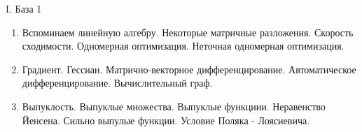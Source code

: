 \documentclass[9pt, aspectratio=169]{beamer}
\begin{document}
\begin{frame}{I. База 1}
    \begin{minipage}{0.618\textwidth}
        \begin{enumerate}
            \item Вспоминаем линейную алгебру. Некоторые матричные разложения. Скорость сходимости. Одномерная оптимизация. Неточная одномерная оптимизация.
            \item Градиент. Гессиан. Матрично-векторное дифференцирование. Автоматическое дифференцирование. Вычислительный граф.
            \item Выпуклость. Выпуклые множества. Выпуклые функциии. Неравенство Йенсена. Сильно выпулые функции. Условие Поляка - Лоясиевича.
        \end{enumerate}
      \end{minipage}%
      \begin{minipage}{0.382\textwidth}
      \end{minipage}
\end{frame}
\end{document}
